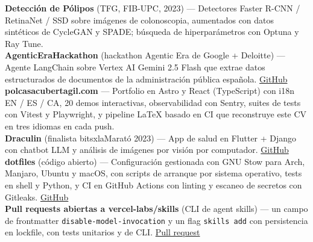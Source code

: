 
\begin{cvparagraph}
    \textbf{Detección de Pólipos} (TFG, FIB-UPC, 2023) --- Detectores Faster R-CNN / RetinaNet / SSD sobre imágenes de colonoscopia, aumentados con datos sintéticos de CycleGAN y SPADE; búsqueda de hiperparámetros con Optuna y Ray Tune. \\
    \textbf{AgenticEraHackathon} (hackathon Agentic Era de Google + Deloitte) --- Agente LangChain sobre Vertex AI Gemini 2.5 Flash que extrae datos estructurados de documentos de la administración pública española. \href{https://github.com/cuberhaus/AgenticEraHackathon}{GitHub} \\
    \textbf{polcasacubertagil.com} --- Portfolio en Astro y React (TypeScript) con i18n EN / ES / CA, 20 demos interactivas, observabilidad con Sentry, suites de tests con Vitest y Playwright, y pipeline LaTeX basado en CI que reconstruye este CV en tres idiomas en cada push. \\
    \textbf{Draculin} (finalista bitsxlaMarató 2023) --- App de salud en Flutter + Django con chatbot LLM y análisis de imágenes por visión por computador. \href{https://github.com/cuberhaus/Draculin-Backend}{GitHub} \\
    \textbf{dotfiles} (código abierto) --- Configuración gestionada con GNU Stow para Arch, Manjaro, Ubuntu y macOS, con scripts de arranque por sistema operativo, tests en shell y Python, y CI en GitHub Actions con linting y escaneo de secretos con Gitleaks. \href{https://github.com/cuberhaus/dotfiles}{GitHub} \\
    \textbf{Pull requests abiertas a vercel-labs/skills} (CLI de agent skills) --- un campo de frontmatter \texttt{disable-model-invocation} y un flag \texttt{skills add} con persistencia en lockfile, con tests unitarios y de CLI. \href{https://github.com/vercel-labs/skills/pull/2498}{Pull request}
\end{cvparagraph}
